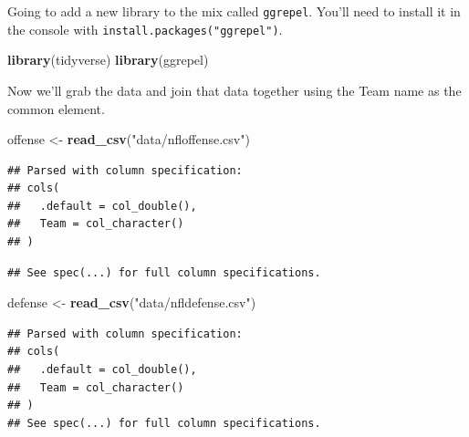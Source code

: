 \documentclass[]{book}
\newenvironment{Shaded}{\begin{snugshade}}{\end{snugshade}}
\newcommand{\DataTypeTok}[1]{\textcolor[rgb]{0.13,0.29,0.53}{#1}}
\newcommand{\KeywordTok}[1]{\textcolor[rgb]{0.13,0.29,0.53}{\textbf{#1}}}
\newcommand{\NormalTok}[1]{#1}
\newcommand{\OperatorTok}[1]{\textcolor[rgb]{0.81,0.36,0.00}{\textbf{#1}}}
\newcommand{\StringTok}[1]{\textcolor[rgb]{0.31,0.60,0.02}{#1}}
\begin{document}
Going to add a new library to the mix called \texttt{ggrepel}. You'll need to install it in the console with \texttt{install.packages("ggrepel")}.

\begin{Shaded}
\begin{Highlighting}[]
\KeywordTok{library}\NormalTok{(tidyverse)}
\KeywordTok{library}\NormalTok{(ggrepel)}
\end{Highlighting}
\end{Shaded}

Now we'll grab the data and join that data together using the Team name as the common element.

\begin{Shaded}
\begin{Highlighting}[]
\NormalTok{offense <-}\StringTok{ }\KeywordTok{read_csv}\NormalTok{(}\StringTok{"data/nfloffense.csv"}\NormalTok{)}
\end{Highlighting}
\end{Shaded}

\begin{verbatim}
## Parsed with column specification:
## cols(
##   .default = col_double(),
##   Team = col_character()
## )
\end{verbatim}

\begin{verbatim}
## See spec(...) for full column specifications.
\end{verbatim}

\begin{Shaded}
\begin{Highlighting}[]
\NormalTok{defense <-}\StringTok{ }\KeywordTok{read_csv}\NormalTok{(}\StringTok{"data/nfldefense.csv"}\NormalTok{)}
\end{Highlighting}
\end{Shaded}

\begin{verbatim}
## Parsed with column specification:
## cols(
##   .default = col_double(),
##   Team = col_character()
## )
## See spec(...) for full column specifications.
\end{verbatim}

\begin{Shaded}
\end{Shaded}
\end{document}
